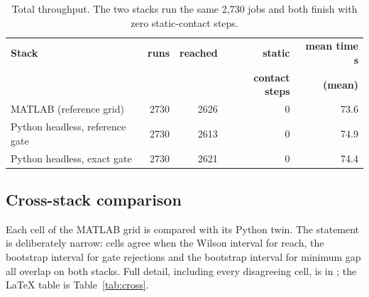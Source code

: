 \begin{table}[H]
\centering\footnotesize
\begin{tabular}{@{}lrrrr@{}}
\toprule
\textbf{Stack} & \textbf{runs} & \textbf{reached} & \textbf{static} & \textbf{mean time s}\\
 & & & \textbf{contact steps} & \textbf{(mean)}\\
\midrule
MATLAB (reference grid) & 2730 & 2626 & 0 & 73.6\\
Python headless, reference gate & 2730 & 2613 & 0 & 74.9\\
Python headless, exact gate & 2730 & 2621 & 0 & 74.4\\
\bottomrule
\end{tabular}
\caption{Total throughput. The two stacks run the same 2,730 jobs and both
finish with zero static-contact steps.}
\label{tab:grid_stats}
\end{table}

\subsection{Cross-stack comparison}
\label{sec:cross}

Each cell of the MATLAB grid is compared with its Python twin. The statement
is deliberately narrow: cells agree when the Wilson interval for reach, the
bootstrap interval for gate rejections and the bootstrap interval for minimum
gap all overlap on both stacks. Full detail, including every disagreeing
cell, is in ; the LaTeX table is Table~\ref{tab:cross}.

\begin{table}[H]
\centering

\caption{Cross-stack comparison (reference gate), 221 cells. "agree" means
the three intervals overlap.}
\label{tab:cross}
\end{table}

\begin{table}[H]
\centering

\caption{Cross-stack comparison (exact gate), 221 cells. The correction to
the reference gate is the single largest source of disagreement: 21 of the
25 differ only in the histogram-law rejection counts of the low-noise cells
(E1, E2 at sigma0 = 0.02, and the matching rows of E8, E10, E12), where the
reference gate reports 3--6 rejections per run and the corrected gate 0.0.
Reach is unchanged in all 221 cells.}
\label{tab:cross_exact}
\end{table}

